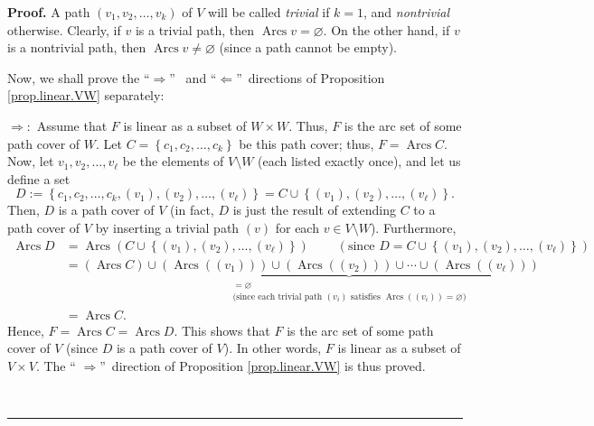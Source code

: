 \documentclass[numbers=enddot,12pt,final,onecolumn,notitlepage]{scrartcl}%
\numberwithin{exer}{section}
\theoremstyle{definition}
\newenvironment{proof}[1][Proof]{\noindent\textbf{#1.} }{\ \rule{0.5em}{0.5em}}
\newenvironment{verlong}{}{}
\begin{document}
\begin{verlong}


\begin{proof}
A path $\left(  v_{1},v_{2},\ldots,v_{k}\right)  $ of $V$ will be called
\emph{trivial} if $k=1$, and \emph{nontrivial} otherwise. Clearly, if $v$ is a
trivial path, then $\operatorname*{Arcs}v=\varnothing$. On the other hand, if
$v$ is a nontrivial path, then $\operatorname*{Arcs}v\neq\varnothing$ (since a
path cannot be empty).

Now, we shall prove the \textquotedblleft$\Longrightarrow$\textquotedblright%
\ and \textquotedblleft$\Longleftarrow$\textquotedblright\ directions of
Proposition \ref{prop.linear.VW} separately:

$\Longrightarrow:$ Assume that $F$ is linear as a subset of $W\times W$. Thus,
$F$ is the arc set of some path cover of $W$. Let $C=\left\{  c_{1}%
,c_{2},\ldots,c_{k}\right\}  $ be this path cover; thus,
$F=\operatorname*{Arcs}C$. Now, let $v_{1},v_{2},\ldots,v_{\ell}$ be the
elements of $V\setminus W$ (each listed exactly once), and let us define a set%
\[
D:=\left\{  c_{1},c_{2},\ldots,c_{k},\left(  v_{1}\right)  ,\left(
v_{2}\right)  ,\ldots,\left(  v_{\ell}\right)  \right\}  =C\cup\left\{
\left(  v_{1}\right)  ,\left(  v_{2}\right)  ,\ldots,\left(  v_{\ell}\right)
\right\}  .
\]
Then, $D$ is a path cover of $V$ (in fact, $D$ is just the result of extending
$C$ to a path cover of $V$ by inserting a trivial path $\left(  v\right)  $
for each $v\in V\setminus W$). Furthermore,%
\begin{align*}
\operatorname*{Arcs}D  &  =\operatorname*{Arcs}\left(  C\cup\left\{  \left(
v_{1}\right)  ,\left(  v_{2}\right)  ,\ldots,\left(  v_{\ell}\right)
\right\}  \right)  \ \ \ \ \ \ \ \ \ \ \left(  \text{since }D=C\cup\left\{
\left(  v_{1}\right)  ,\left(  v_{2}\right)  ,\ldots,\left(  v_{\ell}\right)
\right\}  \right) \\
&  =\left(  \operatorname*{Arcs}C\right)  \cup\underbrace{\left(
\operatorname*{Arcs}\left(  \left(  v_{1}\right)  \right)  \right)
\cup\left(  \operatorname*{Arcs}\left(  \left(  v_{2}\right)  \right)
\right)  \cup\cdots\cup\left(  \operatorname*{Arcs}\left(  \left(  v_{\ell
}\right)  \right)  \right)  }_{\substack{=\varnothing\\\text{(since each
trivial path }\left(  v_{i}\right)  \text{ satisfies }\operatorname*{Arcs}%
\left(  \left(  v_{i}\right)  \right)  =\varnothing\text{)}}}\\
&  =\operatorname*{Arcs}C.
\end{align*}
Hence, $F=\operatorname*{Arcs}C=\operatorname*{Arcs}D$. This shows that $F$ is
the arc set of some path cover of $V$ (since $D$ is a path cover of $V$). In
other words, $F$ is linear as a subset of $V\times V$. The \textquotedblleft%
$\Longrightarrow$\textquotedblright\ direction of Proposition
\ref{prop.linear.VW} is thus proved.


\end{proof}
\end{verlong}
\end{document}
